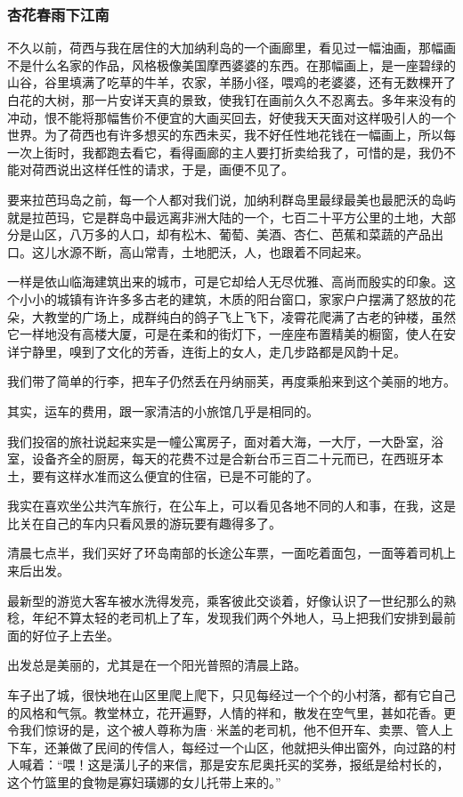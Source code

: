 \subsubsection*{杏花春雨下江南}
\par 不久以前，荷西与我在居住的大加纳利岛的一个画廊里，看见过一幅油画，那幅画不是什么名家的作品，风格极像美国摩西婆婆的东西。在那幅画上，是一座碧绿的山谷，谷里填满了吃草的牛羊，农家，羊肠小径，喂鸡的老婆婆，还有无数棵开了白花的大树，那一片安详天真的景致，使我钉在画前久久不忍离去。多年来没有的冲动，恨不能将那幅售价不便宜的大画买回去，好使我天天面对这样吸引人的一个世界。为了荷西也有许多想买的东西未买，我不好任性地花钱在一幅画上，所以每一次上街时，我都跑去看它，看得画廊的主人要打折卖给我了，可惜的是，我仍不能对荷西说出这样任性的请求，于是，画便不见了。
\par 要来拉芭玛岛之前，每一个人都对我们说，加纳利群岛里最绿最美也最肥沃的岛屿就是拉芭玛，它是群岛中最远离非洲大陆的一个，七百二十平方公里的土地，大部分是山区，八万多的人口，却有松木、葡萄、美酒、杏仁、芭蕉和菜蔬的产品出口。这儿水源不断，高山常青，土地肥沃，人，也跟着不同起来。
\par 一样是依山临海建筑出来的城市，可是它却给人无尽优雅、高尚而殷实的印象。这个小小的城镇有许许多多古老的建筑，木质的阳台窗口，家家户户摆满了怒放的花朵，大教堂的广场上，成群纯白的鸽子飞上飞下，凌霄花爬满了古老的钟楼，虽然它一样地没有高楼大厦，可是在柔和的街灯下，一座座布置精美的橱窗，使人在安详宁静里，嗅到了文化的芳香，连街上的女人，走几步路都是风韵十足。
\par 我们带了简单的行李，把车子仍然丢在丹纳丽芙，再度乘船来到这个美丽的地方。
\par 其实，运车的费用，跟一家清洁的小旅馆几乎是相同的。
\par 我们投宿的旅社说起来实是一幢公寓房子，面对着大海，一大厅，一大卧室，浴室，设备齐全的厨房，每天的花费不过是合新台币三百二十元而已，在西班牙本土，要有这样水准而这么便宜的住宿，已是不可能的了。
\par 我实在喜欢坐公共汽车旅行，在公车上，可以看见各地不同的人和事，在我，这是比关在自己的车内只看风景的游玩要有趣得多了。
\par 清晨七点半，我们买好了环岛南部的长途公车票，一面吃着面包，一面等着司机上来后出发。
\par 最新型的游览大客车被水洗得发亮，乘客彼此交谈着，好像认识了一世纪那么的熟稔，年纪不算太轻的老司机上了车，发现我们两个外地人，马上把我们安排到最前面的好位子上去坐。
\par 出发总是美丽的，尤其是在一个阳光普照的清晨上路。
\par 车子出了城，很快地在山区里爬上爬下，只见每经过一个个的小村落，都有它自己的风格和气氛。教堂林立，花开遍野，人情的祥和，散发在空气里，甚如花香。更令我们惊讶的是，这个被人尊称为唐·米盖的老司机，他不但开车、卖票、管人上下车，还兼做了民间的传信人，每经过一个山区，他就把头伸出窗外，向过路的村人喊着：“喂！这是潢儿子的来信，那是安东尼奥托买的奖券，报纸是给村长的，这个竹篮里的食物是寡妇璜娜的女儿托带上来的。”
